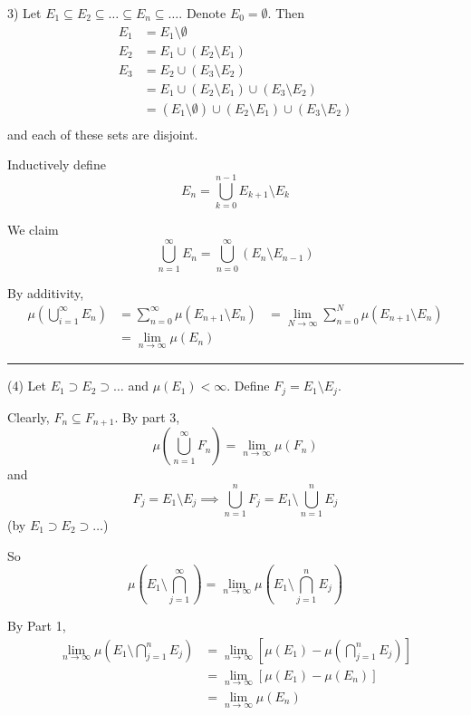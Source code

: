 \documentclass[12pt]{report}
\newcommand{\sub}{\subseteq}
\renewcommand{\div}{\vspace*{10pt}\hrule\vspace*{10pt}}
\newenvironment*{tbox}[2][gray]{
    \begin{tcolorbox}[
        parbox=false,
        colback=#1!5!white,
        colframe=#1!75!black,
        breakable,
        title={#2}
    ]}
    {\end{tcolorbox}}
\begin{document}
\begin{tbox}
            (3) Let $E_1 \sub E_2 \sub \dots \sub E_n \sub \dots$. Denote $E_0 = \emptyset$. Then 
            \begin{align*}
                E_1 &= E_1 \setminus \emptyset\\
                E_2 &= E_1 \cup (E_2 \setminus E_1)\\
                E_3 &= E_2 \cup (E_3 \setminus E_2)\\
                &= E_1 \cup (E_2 \setminus E_1) \cup (E_3 \setminus E_2)\\
                &= (E_1 \setminus \emptyset) \cup (E_2 \setminus E_1) \cup (E_3 \setminus E_2)\\
            \end{align*}
            and each of these sets are disjoint. 

            Inductively define 
            \[E_n = \bigcup_{k=0}^{n-1} E_{k+1}\setminus E_{k}\]

            We claim 
            \[\bigcup_{n=1}^{\infty} E_n = \bigcup_{n=0}^{\infty} (E_n \setminus E_{n-1})\]

            By additivity, 
            \begin{align*}
                \mu\left(\bigcup_{i=1}^\infty E_n\right) &= \sum_{n=0}^{\infty} \mu(E_{n+1} \setminus E_{n})
                    &= \lim_{N \to \infty} \sum_{n=0}^N \mu(E_{n+1} \setminus E_{n})\\ 
                    &=  \lim_{n \to \infty} \mu(E_n)
            \end{align*}

            \div 

            (4) Let $E_1 \supset E_2 \supset \dots$ and $\mu(E_1) < \infty$. Define $F_j = E_1 \setminus E_j$. 

            Clearly, $F_n \sub F_{n+1}$. By part 3, 
            \[\mu\left(\bigcup_{n=1}^\infty F_n\right) = \lim_{n\to \infty} \mu(F_n)\]
            and 
            \[F_j = E_1 \setminus E_j \implies \bigcup_{n=1}^n F_j = E_1 \setminus \bigcup_{n=1}^n E_j\]
            (by $E_1 \supset E_2 \supset \dots$)

            So 
            \[\mu\left(E_1 \setminus \bigcap_{j=1}^{\infty}\right) = \lim_{n\to \infty} \mu(E_1 \setminus \bigcap_{j=1}^n E_j)\]

            By Part 1, 
            \begin{align*}
                \lim_{n\to \infty} \mu(E_1 \setminus \bigcap_{j=1}^n E_j) &= \lim_{n \to \infty} \left[\mu(E_1) - \mu(\bigcap_{j=1}^n E_j)\right]\\ 
                    &= \lim_{n \to \infty} \left[\mu(E_1) - \mu(E_n)\right]\\ 
                    &= \lim_{n \to \infty} \mu(E_n)
            \end{align*}
        \end{tbox}
\end{document}

